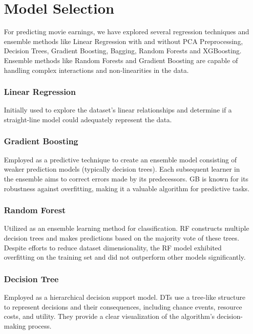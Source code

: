 \documentclass[conference]{IEEEtran}
\begin{document}
\section{Model Selection}
    For predicting movie earnings, we have explored several regression techniques and ensemble methods like Linear Regression with and without PCA Preprocessing, Decision Trees, Gradient Boosting, Bagging, Random Forests and XGBoosting.
    Ensemble methods like Random Forests and Gradient Boosting are capable of handling complex interactions and non-linearities in the data.
    
    \subsubsection{Linear Regression}
        Initially used to explore the dataset's linear relationships and determine if a straight-line model could adequately represent the data.
    
    \subsubsection{Gradient Boosting}
        Employed as a predictive technique to create an ensemble model consisting of weaker prediction models (typically decision trees). Each subsequent learner in the ensemble aims to correct errors made by its predecessors. GB is known for its robustness against overfitting, making it a valuable algorithm for predictive tasks.
    
    \subsubsection{Random Forest}
        Utilized as an ensemble learning method for classification. RF constructs multiple decision trees and makes predictions based on the majority vote of these trees. Despite efforts to reduce dataset dimensionality, the RF model exhibited overfitting on the training set and did not outperform other models significantly.
    
    \subsubsection{Decision Tree}
        Employed as a hierarchical decision support model. DTs use a tree-like structure to represent decisions and their consequences, including chance events, resource costs, and utility. They provide a clear visualization of the algorithm's decision-making process.
    
\end{document}

